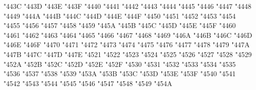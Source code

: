 {\Uchar\jis"443C %
\Uchar\jis"443D %
\Uchar\jis"443E %
\Uchar\jis"443F %
\Uchar\jis"4440 %
\Uchar\jis"4441 %
\Uchar\jis"4442 %
\Uchar\jis"4443 %
\Uchar\jis"4444 %
\Uchar\jis"4445 %
\Uchar\jis"4446 %
\Uchar\jis"4447 %
\Uchar\jis"4448 %
\Uchar\jis"4449 %
\Uchar\jis"444A %
\Uchar\jis"444B %
\Uchar\jis"444C %
\Uchar\jis"444D %
\Uchar\jis"444E %
\Uchar\jis"444F %
\Uchar\jis"4450 %
\Uchar\jis"4451 %
\Uchar\jis"4452 %
\Uchar\jis"4453 %
\Uchar\jis"4454 %
\Uchar\jis"4455 %
\Uchar\jis"4456 %
\Uchar\jis"4457 %
\Uchar\jis"4458 %
\Uchar\jis"4459 %
\Uchar\jis"445A %
\Uchar\jis"445B %
\Uchar\jis"445C %
\Uchar\jis"445D %
\Uchar\jis"445E %
\Uchar\jis"445F %
\Uchar\jis"4460 %
\Uchar\jis"4461 %
\Uchar\jis"4462 %
\Uchar\jis"4463 %
\Uchar\jis"4464 %
\Uchar\jis"4465 %
\Uchar\jis"4466 %
\Uchar\jis"4467 %
\Uchar\jis"4468 %
\Uchar\jis"4469 %
\Uchar\jis"446A %
\Uchar\jis"446B %
\Uchar\jis"446C %
\Uchar\jis"446D %
\Uchar\jis"446E %
\Uchar\jis"446F %
\Uchar\jis"4470 %
\Uchar\jis"4471 %
\Uchar\jis"4472 %
\Uchar\jis"4473 %
\Uchar\jis"4474 %
\Uchar\jis"4475 %
\Uchar\jis"4476 %
\Uchar\jis"4477 %
\Uchar\jis"4478 %
\Uchar\jis"4479 %
\Uchar\jis"447A %
\Uchar\jis"447B %
\Uchar\jis"447C %
\Uchar\jis"447D %
\Uchar\jis"447E %
\Uchar\jis"4521 %
\Uchar\jis"4522 %
\Uchar\jis"4523 %
\Uchar\jis"4524 %
\Uchar\jis"4525 %
\Uchar\jis"4526 %
\Uchar\jis"4527 %
\Uchar\jis"4528 %
\Uchar\jis"4529 %
\Uchar\jis"452A %
\Uchar\jis"452B %
\Uchar\jis"452C %
\Uchar\jis"452D %
\Uchar\jis"452E %
\Uchar\jis"452F %
\Uchar\jis"4530 %
\Uchar\jis"4531 %
\Uchar\jis"4532 %
\Uchar\jis"4533 %
\Uchar\jis"4534 %
\Uchar\jis"4535 %
\Uchar\jis"4536 %
\Uchar\jis"4537 %
\Uchar\jis"4538 %
\Uchar\jis"4539 %
\Uchar\jis"453A %
\Uchar\jis"453B %
\Uchar\jis"453C %
\Uchar\jis"453D %
\Uchar\jis"453E %
\Uchar\jis"453F %
\Uchar\jis"4540 %
\Uchar\jis"4541 %
\Uchar\jis"4542 %
\Uchar\jis"4543 %
\Uchar\jis"4544 %
\Uchar\jis"4545 %
\Uchar\jis"4546 %
\Uchar\jis"4547 %
\Uchar\jis"4548 %
\Uchar\jis"4549 %
\Uchar\jis"454A %
}
